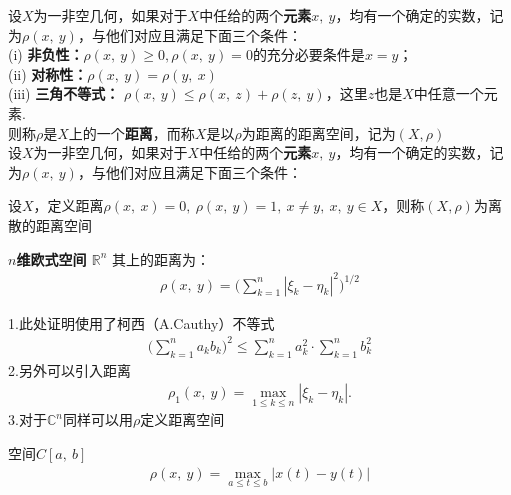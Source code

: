 \begin{newdef}
	设$X$为一非空几何，如果对于$X$中任给的两个\textbf{元素}$x,\ y$，均有一个确定的实数，记为$\rho\left( x, \ y \right)$，与他们对应且满足下面三个条件：\\
	(i) \textbf{非负性：}$\rho (x,\ y)\geqslant 0, \rho (x,\ y)=0 $的充分必要条件是$x=y$；\\
	(ii) \textbf{对称性：}$\rho (x,\ y)=\rho (y, \ x)$\\
	(iii) \textbf{三角不等式：} $\rho (x,\ y)\leqslant \rho (x,\ z)+\rho (z, \ y)$，这里$z$也是$X$中任意一个元素.\\
	则称$\rho $是$X$上的一个\textbf{距离}，而称$X$是以$\rho$为距离的距离空间，记为$(X, \rho)$\\
	设$X$为一非空几何，如果对于$X$中任给的两个\textbf{元素}$x,\ y$，均有一个确定的实数，记为$\rho\left( x, \ y \right)$，与他们对应且满足下面三个条件：
\end{newdef}

\begin{note}
	设$X$，定义距离$\rho(x, \ x )=0,\  \rho(x, \ y)=1 , \ x\neq y, \ x, \ y \in X$，则称$(X,\rho)$为离散的距离空间
\end{note}


\begin{newex}
	\textbf{$n$维欧式空间 $\mathbb R ^n$}
	其上的距离为：
	\begin{align}
		\rho (x, \ y)=\big( \sum\limits_{k=1}^n | \xi_k- \eta_k|^2 \big)^{1/2} \label{eq:rho1}
	\end{align}
\end{newex}

\begin{note}
	1.此处证明使用了柯西（A.Cauthy）不等式
	\begin{align}
		\big(\sum \limits_{k=1}^n a_k b_k \big)^2 \leqslant \sum \limits_{k=1}^n a_k^2 \cdot \sum \limits_{k=1}^n b_k^2
	\end{align}
	2.另外可以引入距离
	\begin{align*}
		\rho_1(x,\ y)=\max \limits_{1\leqslant k \leqslant n}|\xi_k-\eta_k|. \tag*{(1')}
		\label{eq:rho1'}
	\end{align*}
	3.对于$\mathbb C^n$同样可以用$\rho$定义距离空间
\end{note}

\begin{newex}
	空间$C[a,\ b]$
	\begin{align}
        \rho(x, \ y)=\max\limits_{a \leqslant t \leqslant b} |x(t)-y(t)|
        \label{eq:rho3}
	\end{align}
\end{newex}

